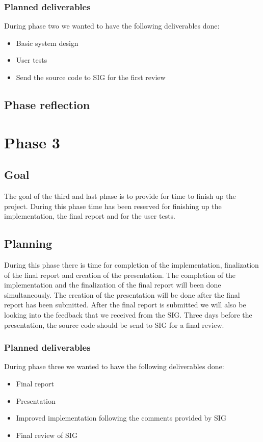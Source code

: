\subsubsection{Planned deliverables}
During phase two we wanted to have the following deliverables done:
\begin{itemize}
\item Basic system design
\item User tests
\item Send the source code to SIG for the first review
\end{itemize}

\subsection{Phase reflection}

\section{Phase 3}
\subsection{Goal}
The goal of the third and last phase is to provide for time to finish up the project.
During this phase time has been reserved for finishing up the implementation, the final report and for the user tests.

\subsection{Planning}
During this phase there is time for completion of the implementation, finalization of the final report and creation of the presentation.
The completion of the implementation and the finalization of the final report will been done simultaneously.
The creation of the presentation will be done after the final report has been submitted.
After the final report is submitted we will also be looking into the feedback that we received from the SIG.
Three days before the presentation, the source code should be send to SIG for a final review.

\subsubsection{Planned deliverables}
During phase three we wanted to have the following deliverables done:
\begin{itemize}
\item Final report
\item Presentation
\item Improved implementation following the comments provided by SIG
\item Final review of SIG
\end{itemize}

